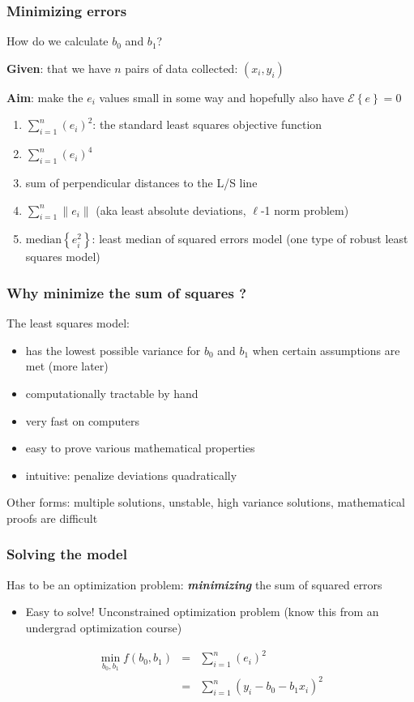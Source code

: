 \begin{frame}\frametitle{Minimizing errors}
	
	How do we calculate $b_0$ and $b_1$?
	
	\textbf{Given}: that we have $n$ pairs of data collected: $(x_i, y_i)$
	
	\textbf{Aim}: make the $e_i$ values small in some way and hopefully also have $\mathcal{E}\left\{e\right\} = 0$
	\begin{enumerate}
		\item	$\sum_{i=1}^{n}{(e_i)^2}$: the standard least squares objective function 
		\item	$\sum_{i=1}^{n}{(e_i)^4}$ 
		\item	sum of perpendicular distances to the L/S line 
		\item	$\sum_{i=1}^{n}{\|e_i\|}$ (aka least absolute deviations, $\ell$-1 norm problem) 
		\item	$\text{median}\left\{ e_i^2 \right\}$: least median of squared errors model (one type of robust least squares model) 
	\end{enumerate}
\end{frame}

\begin{frame}\frametitle{Why minimize the sum of squares ?}
	
	The least squares model: 
	\begin{itemize}
		\item	has the lowest possible variance for $b_0$ and $b_1$ when certain assumptions are met (more later) 
		\item	computationally tractable by hand 
		\item	very fast on computers 
		\item	easy to prove various mathematical properties 
		\item	intuitive: penalize deviations quadratically 
	\end{itemize}
	
	Other forms: multiple solutions, unstable, high variance solutions, mathematical proofs are difficult
\end{frame}

\begin{frame}\frametitle{Solving the model}
	
	Has to be an optimization problem: \textbf{\emph{minimizing}} the sum of squared errors
	\begin{itemize}
		\item	Easy to solve! Unconstrained optimization problem (know this from an undergrad optimization course) 
	\end{itemize}
	
	$$ 
	\begin{array}{rcl}
		\min_{\displaystyle b_0, b_1} f(b_0, b_1) &=& \sum_{i=1}^{n}{(e_i)^2} \\
		&=& \sum_{i=1}^{n}{\left(y_i - b_0 - b_1 x_i\right)^2} 
	\end{array}
	$$
\end{frame}

